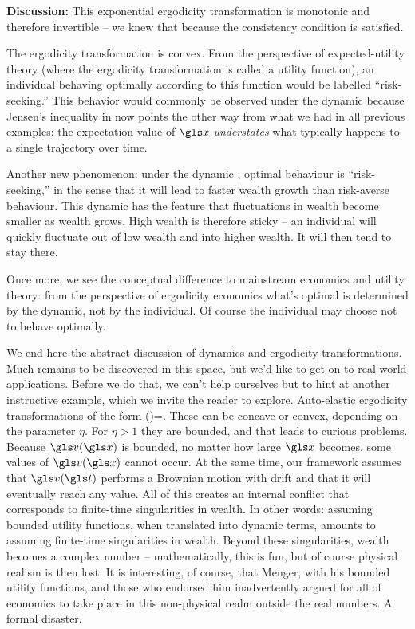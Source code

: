 {\bf Discussion:} 
This exponential ergodicity transformation is monotonic and 
therefore invertible -- we knew that because the consistency condition is satisfied. 

The ergodicity transformation is convex. From the 
perspective of expected-utility theory (where the ergodicity transformation is called a utility function),
an individual behaving optimally according to 
this function would be labelled ``risk-seeking.'' This behavior would commonly be observed
under the dynamic  because Jensen's inequality 
in  now points the other way from what we had in all previous examples: 
the expectation value of $\x$ {\it understates} 
what typically happens to a single trajectory over time.


Another new phenomenon: 
under the dynamic , optimal behaviour is ``risk-seeking,'' 
in the sense that it will lead to faster wealth growth than risk-averse behaviour. 
This dynamic has the feature that fluctuations in wealth become smaller 
as wealth grows. High wealth is therefore sticky -- an individual will quickly fluctuate out of 
low wealth and into higher wealth. It will then tend to stay there. 

Once more, we see the conceptual difference to mainstream economics and utility theory:
from the perspective of ergodicity economics what's optimal is determined by the dynamic, 
not by the individual. Of course the individual may choose not to behave optimally. 

We end here the abstract discussion of dynamics and ergodicity transformations. Much remains to be discovered
in this space, but we'd like to get on to real-world applications. Before we do that, we 
can't help ourselves but to hint at another instructive example, which we invite the 
reader to explore. Auto-elastic ergodicity transformations of the form
\be
\gv(\x)=.
\ee
These can be concave or convex, depending on the parameter $\eta$. For $\eta>1$
they are bounded, and that leads to curious problems. Because $\gv(\x)$ is bounded, 
no matter how large $\x$ becomes, some values of $\gv(\x)$ cannot occur. 
At the same time, our framework assumes that $\gv(\t)$
performs a Brownian motion with drift and that it will eventually reach any value. 
All of this creates an internal conflict that corresponds
to finite-time singularities in wealth. In other words: assuming bounded utility functions, 
when translated into dynamic terms, amounts to assuming finite-time singularities in wealth.
Beyond these singularities, wealth becomes a complex number -- mathematically, this is
fun, but of course physical realism is then lost. It is interesting, of course, that 
Menger, with his bounded utility functions, and those who endorsed him inadvertently 
argued for all of economics to take place in this non-physical realm outside the real 
numbers. A formal disaster.

